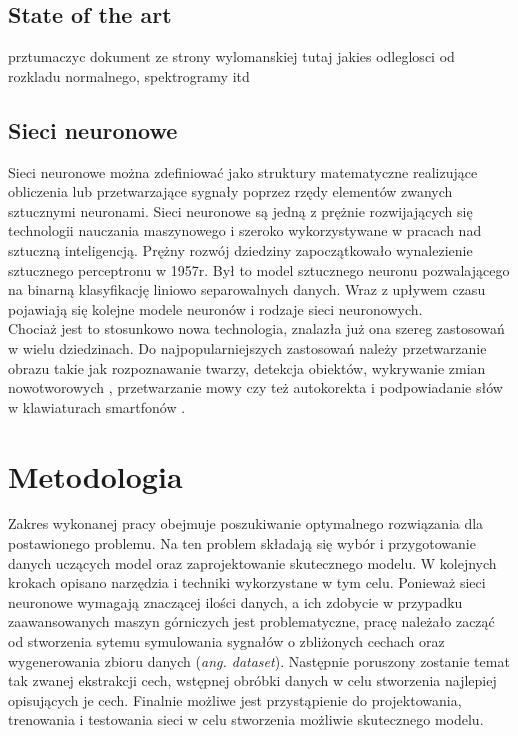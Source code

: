 \documentclass[12pt, a4paper, oneside]{article}
\begin{document}
	\subsection{State of the art}
	prztumaczyc dokument ze strony wylomanskiej 
	{\Huge tutaj jakies odleglosci od rozkladu normalnego, spektrogramy itd}
	
	
	\subsection{Sieci neuronowe}
	Sieci neuronowe można zdefiniować jako struktury matematyczne realizujące obliczenia lub przetwarzające sygnały poprzez rzędy elementów zwanych sztucznymi neuronami.
	Sieci neuronowe są jedną z prężnie rozwijających się technologii nauczania maszynowego i szeroko wykorzystywane w pracach nad sztuczną inteligencją.
	Prężny rozwój dziedziny zapoczątkowało wynalezienie sztucznego perceptronu w 1957r. Był to model sztucznego neuronu pozwalającego na binarną klasyfikację liniowo separowalnych danych. Wraz z upływem czasu pojawiają się kolejne modele neuronów i rodzaje sieci neuronowych. 
	\\
	Chociaż jest to stosunkowo nowa technologia, znalazła już ona szereg zastosowań w wielu dziedzinach. Do najpopularniejszych zastosowań należy przetwarzanie obrazu takie jak rozpoznawanie twarzy, detekcja obiektów, wykrywanie zmian nowotworowych \cite{nnnature}, przetwarzanie mowy \cite{nnspeech} czy też autokorekta i podpowiadanie słów w klawiaturach smartfonów \cite{nngboard}.
	
	\newpage
	
	
	\section{Metodologia}
	Zakres wykonanej pracy obejmuje poszukiwanie optymalnego rozwiązania dla postawionego problemu. Na ten problem składają się wybór i przygotowanie danych uczących model oraz zaprojektowanie skutecznego modelu. 
	W kolejnych krokach opisano narzędzia i techniki wykorzystane w tym celu. Ponieważ sieci neuronowe wymagają znaczącej ilości danych, a ich zdobycie w przypadku zaawansowanych maszyn górniczych jest problematyczne, pracę należało zacząć od stworzenia sytemu symulowania sygnałów o zbliżonych cechach oraz wygenerowania zbioru danych (\textit{ang. dataset}). Następnie poruszony zostanie temat tak zwanej ekstrakcji cech, wstępnej obróbki danych w celu stworzenia najlepiej opisujących je cech. Finalnie możliwe jest przystąpienie do projektowania, trenowania i testowania sieci w celu stworzenia możliwie skutecznego modelu.
\end{document}
